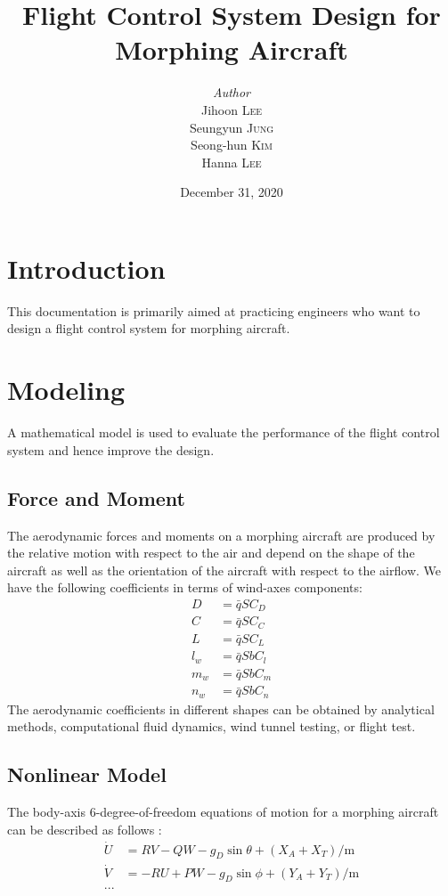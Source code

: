 \documentclass[a4paper, 12pt]{report}
\institute{Seoul National University}
\title{Flight Control System Design for Morphing Aircraft}
\author{\textit{Author}\\Jihoon \textsc{Lee}\\Seungyun \textsc{Jung}\\Seong-hun \textsc{Kim}\\Hanna \textsc{Lee}}
\date{December 31, 2020}
\begin{document}
    \maketitle
    \romantableofcontents

    \chapter{Introduction}

    This documentation is primarily aimed at practicing engineers who want to design a flight control system for morphing aircraft. 

	\chapter{Modeling}

	A mathematical model is used to evaluate the performance of the flight control system and hence improve the design.
	
	\section{Force and Moment}
	
	The aerodynamic forces and moments on a morphing aircraft are produced by the relative motion with respect to the air and depend on the shape of the aircraft as well as the orientation of the aircraft with respect to the airflow. 
	We have the following coefficients in terms of wind-axes components:
	\begin{align}
		D &= \bar{q}SC_D \\
		C &= \bar{q}SC_C \\
		L &= \bar{q}SC_L \\
		l_w &= \bar{q}SbC_l \\
		m_w &= \bar{q}SbC_m \\
		n_w &= \bar{q}SbC_n
	\end{align}
	The aerodynamic coefficients in different shapes can be obtained by analytical methods, computational fluid dynamics, wind tunnel testing, or flight test.
	
	\section{Nonlinear Model}
	
	The body-axis 6-degree-of-freedom equations of motion for a morphing aircraft can be described as follows \cite{stevens2015aircraft}:
	\begin{align}
		\dot{U} &= RV-QW-g_D\sin\theta+(X_A+X_T)/\text{m} \\
		\dot{V} &= -RU+PW-g_D\sin\phi+(Y_A+Y_T)/\text{m} \\
		...
	\end{align}
	
\end{document}
